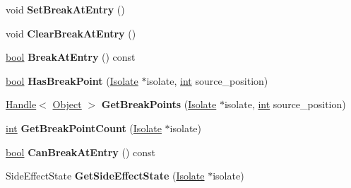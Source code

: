 \begin{DoxyCompactItemize}
\item 
\mbox{\label{classv8_1_1internal_1_1DebugInfo_a11aa63c2d6ed0eb06045fab2f6441fe2}} 
void {\bfseries Set\+Break\+At\+Entry} ()
\item 
\mbox{\label{classv8_1_1internal_1_1DebugInfo_a809413888394c8294d0b51fafbadfc21}} 
void {\bfseries Clear\+Break\+At\+Entry} ()
\item 
\mbox{\label{classv8_1_1internal_1_1DebugInfo_a5772a891f3301fb5b46197b2f2e96c85}} 
\mbox{\hyperlink{classbool}{bool}} {\bfseries Break\+At\+Entry} () const
\item 
\mbox{\label{classv8_1_1internal_1_1DebugInfo_a1325f18b40d385a8d4a965911b7d1477}} 
\mbox{\hyperlink{classbool}{bool}} {\bfseries Has\+Break\+Point} (\mbox{\hyperlink{classv8_1_1internal_1_1Isolate}{Isolate}} $\ast$isolate, \mbox{\hyperlink{classint}{int}} source\+\_\+position)
\item 
\mbox{\label{classv8_1_1internal_1_1DebugInfo_a672fc4ccc79c1810f0970ff72fc225f6}} 
\mbox{\hyperlink{classv8_1_1internal_1_1Handle}{Handle}}$<$ \mbox{\hyperlink{classv8_1_1internal_1_1Object}{Object}} $>$ {\bfseries Get\+Break\+Points} (\mbox{\hyperlink{classv8_1_1internal_1_1Isolate}{Isolate}} $\ast$isolate, \mbox{\hyperlink{classint}{int}} source\+\_\+position)
\item 
\mbox{\label{classv8_1_1internal_1_1DebugInfo_af32d2df481b4ad28a67129b926809f9a}} 
\mbox{\hyperlink{classint}{int}} {\bfseries Get\+Break\+Point\+Count} (\mbox{\hyperlink{classv8_1_1internal_1_1Isolate}{Isolate}} $\ast$isolate)
\item 
\mbox{\label{classv8_1_1internal_1_1DebugInfo_ab82e3c4b731ae708b63dcdfb44699a5b}} 
\mbox{\hyperlink{classbool}{bool}} {\bfseries Can\+Break\+At\+Entry} () const
\item 
\mbox{\label{classv8_1_1internal_1_1DebugInfo_ab04881562acf2b313d382d99d40d53c3}} 
Side\+Effect\+State {\bfseries Get\+Side\+Effect\+State} (\mbox{\hyperlink{classv8_1_1internal_1_1Isolate}{Isolate}} $\ast$isolate)

\end{DoxyCompactItemize}
